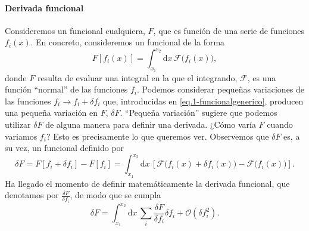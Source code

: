 \paragraph{Derivada funcional} Consideremos un funcional cualquiera, \(F\), que es función de una serie de funciones \(f_i(x)\). En concreto, consideremos un funcional de la forma
\begin{equation}
    \label{eq.1-funcionalgenerico}
    F[f_i(x)] = \int_{x_1}^{x_2}\mathrm{d}x\, \mathcal{F}\big(f_i(x)\big),
\end{equation}
donde \(F\) resulta de evaluar una integral en la que el integrando, \(\mathcal{F}\), es una función ``normal'' de las funciones \(f_i\). Podemos considerar pequeñas variaciones de las funciones \(f_i\rightarrow f_i + \delta f_i\) que, introducidas en \cref{eq.1-funcionalgenerico}, producen una pequeña variación en \(F\), \(\delta F\). ``Pequeña variación'' sugiere que podemos utilizar \(\delta F\) de alguna manera para definir una derivada. ¿Cómo varía \(F\) cuando variamos \(f_i\)? Esto es precisamente lo que queremos ver. Observemos que \(\delta F\) es, a su vez, un funcional definido por
\begin{equation}
    \label{eq.1-funcionalgenerico_delta}
    \delta F = F[f_i + \delta f_i] - F[f_i] = \int_{x_1}^{x_2}\mathrm{d}x\, \left[\mathcal{F}\big(f_i(x) + \delta f_i(x)\big) - \mathcal{F}\big(f_i(x)\big)\right].
\end{equation}
Ha llegado el momento de definir matemáticamente la derivada funcional, que denotamos por \(\frac{\delta F}{\delta f_i}\), de modo que se cumpla
\begin{equation}
    \delta F = \int_{x_1}^{x_2}\mathrm{d}x\, \sum_i \frac{\delta F}{\delta f_i} \delta f_i + \mathcal{O}(\delta f_i^2).
\end{equation}

